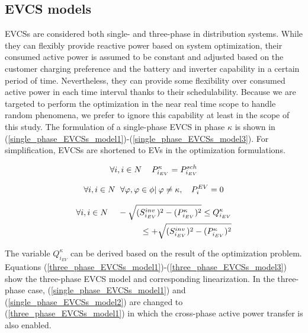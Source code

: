 \documentclass[journal]{IEEEtran}
\begin{document}
   
\subsection {EVCS models}

EVCSs are considered both single- and three-phase in distribution systems. While they can flexibly provide reactive power based on system optimization, their consumed active power is assumed to be constant and adjusted based on the customer charging preference and the battery and inverter capability in a certain period of time. Nevertheless, they can provide some flexibility over consumed active power in each time interval thanks to their schedulability. Because we are targeted to perform the optimization in the near real time scope to handle random phenomena, we prefer to ignore this capability at least in the scope of this study.  The formulation of a single-phase EVCS in phase $ \kappa $ is shown in (\ref{single_phase_EVCSs_model1})-(\ref{single_phase_EVCSs_model3}). For simplification, EVCSs are shortened to EVs in the optimization formulations.

\begin{equation}\label{single_phase_EVCSs_model1}
\forall i, i \in N \hskip 1pc P_{i_{EV}}^{\kappa}=P_{i_{EV}}^{sch}
\end{equation}

\begin{equation}\label{single_phase_EVCSs_model2}
\forall i, i \in N \hskip 0.5pc \forall \varphi, \varphi \in \phi |\hskip 0.2pc \varphi \neq \kappa, \hskip 0.8pc P_{i}^{EV}= 0
\end{equation}

\begin{equation}\label{single_phase_EVCSs_model3}
\begin{split}
\forall i, i \in N \hskip 1pc -\sqrt{(S_{i_{EV}}^{inv})^2 - (P_{i_{EV}}^{\kappa})^2} \leq Q_{i_{EV}}^{\kappa}\\ \leq + \sqrt{(S_{i_{EV}}^{inv})^2 - (P_{i_{EV}}^{\kappa})^2}
\end{split}
\end{equation}

The variable $Q_{i_{EV}} ^{\kappa}$ can be derived based on the result of the optimization problem. Equations (\ref{three_phase_EVCSs_model1})-(\ref{three_phase_EVCSs_model3}) show the three-phase EVCS model and corresponding linearization. In the three-phase case, (\ref{single_phase_EVCSs_model1}) and (\ref{single_phase_EVCSs_model2}) are changed to (\ref{three_phase_EVCSs_model1}) in which the cross-phase active power transfer is also enabled.
\end{document}
